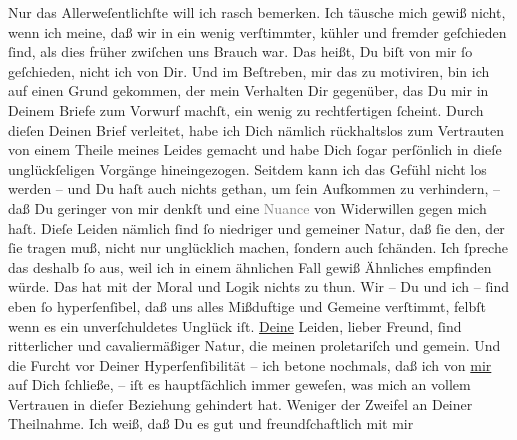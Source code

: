 \pstart
           Nur das Allerweſentlichſte will ich rasch bemerken. Ich täusche mich gewiß nicht,
               wenn ich meine, daß wir in \label{K_L02651-1v}\label{K_L02651-1} ein wenig verſtimmter, kühler und fremder geſchieden ſind,
               als dies früher zwiſchen uns Brauch war. Das heißt, Du biſt von mir ſo geſchieden,
               nicht ich von Dir. Und im Beſtreben, mir das zu motiviren, bin ich auf einen Grund
               gekommen, der mein Verhalten Dir gegenüber, das Du mir in Deinem Briefe zum Vorwurf
               machſt, ein wenig zu rechtfertigen ſcheint. Durch dieſen Deinen Brief verleitet, habe
               ich Dich nämlich rückhaltslos zum Vertrauten von einem Theile meines Leides gemacht
               und habe Dich ſogar perſönlich in dieſe unglückſeligen Vorgänge hineingezogen.
               Seitdem kann ich das Gefühl {\pb}nicht los werden – und
               Du haſt auch nichts gethan, um ſein Aufkommen zu verhindern, – daß Du geringer von
               mir denkſt und eine \textcolor{gray}{Nuance} von Widerwillen gegen mich haſt. Dieſe
               Leiden nämlich ſind ſo niedriger und gemeiner Natur, daß ſie den, der ſie tragen muß,
               nicht nur unglücklich machen, ſondern auch ſchänden. Ich ſpreche das deshalb ſo aus,
               weil ich in einem ähnlichen Fall gewiß Ähnliches empfinden würde. Das hat mit der
               Moral und  Logik nichts zu thun. Wir – Du und ich – ſind eben ſo hyperſenſibel, daß uns
               alles Mißduftige und Gemeine verſtimmt, \strikeout{\textcolor{gray}{ſelbst}} felbſt wenn es ein unverſchuldetes Unglück iſt. \uline{Deine} Leiden, lieber Freund, ſind ritterlicher und cavaliermäßiger Natur,
               die meinen proletariſch und gemein. Und {\pb}die Furcht
               vor Deiner Hyperſenſibilität – ich betone nochmals, daß ich von \uline{mir} auf Dich ſchließe, – iſt es hauptſächlich immer
               geweſen, was mich an vollem Vertrauen in dieſer Beziehung gehindert hat. Weniger der
               Zweifel an Deiner Theilnahme. Ich weiß, daß Du es gut und freundſchaftlich mit mir
